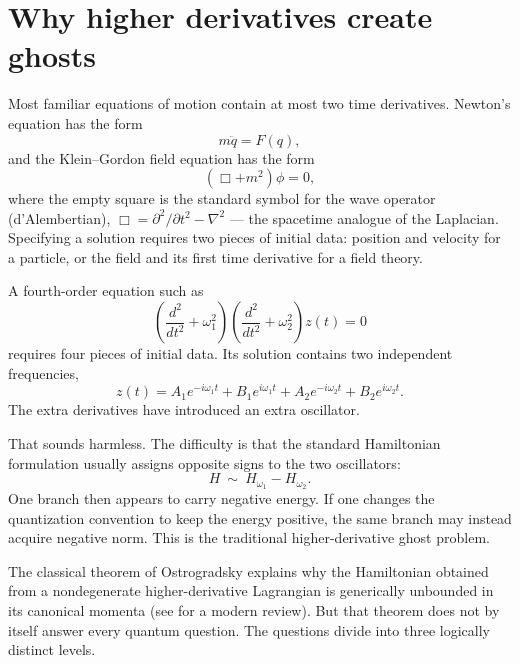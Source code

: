 \documentclass[11pt]{article}
\theoremstyle{remark}
\newcommand{\w}{\omega}
\begin{document}
\tableofcontents

\section{Why higher derivatives create ghosts}\label{sec:why}

Most familiar equations of motion contain at most two time derivatives.
Newton's equation has the form
\begin{equation}
m\ddot q=F(q),
\end{equation}
and the Klein--Gordon field equation has the form
\begin{equation}
(\Box+m^2)\phi=0 ,
\end{equation}
where the empty square is the standard symbol for the wave operator
(d'Alembertian), $\Box=\partial^2/\partial t^2-\nabla^2$ --- the
spacetime analogue of the Laplacian.  Specifying a solution requires two
pieces of initial data: position and
velocity for a particle, or the field and its first time derivative for a
field theory.

A fourth-order equation such as
\begin{equation}
\left(\frac{d^2}{dt^2}+\w_1^2\right)
\left(\frac{d^2}{dt^2}+\w_2^2\right)z(t)=0
\end{equation}
requires four pieces of initial data.  Its solution contains two
independent frequencies,
\begin{equation}
z(t)=A_1e^{-i\w_1t}+B_1e^{i\w_1t}
+A_2e^{-i\w_2t}+B_2e^{i\w_2t}.
\end{equation}
The extra derivatives have introduced an extra oscillator.

That sounds harmless.  The difficulty is that the standard Hamiltonian
formulation usually assigns opposite signs to the two oscillators:
\begin{equation}
H\ \sim\ H_{\w_1}-H_{\w_2}.
\end{equation}
One branch then appears to carry negative energy.  If one changes the
quantization convention to keep the energy positive, the same branch may
instead acquire negative norm.  This is the traditional higher-derivative
ghost problem.

The classical theorem of Ostrogradsky \cite{Ostrogradsky} explains why
the Hamiltonian obtained from a nondegenerate higher-derivative
Lagrangian is generically unbounded in its canonical momenta (see
\cite{Woodard} for a modern review).  But that theorem does not by itself
answer every quantum question.  The questions divide into three logically
distinct levels.
\end{document}

